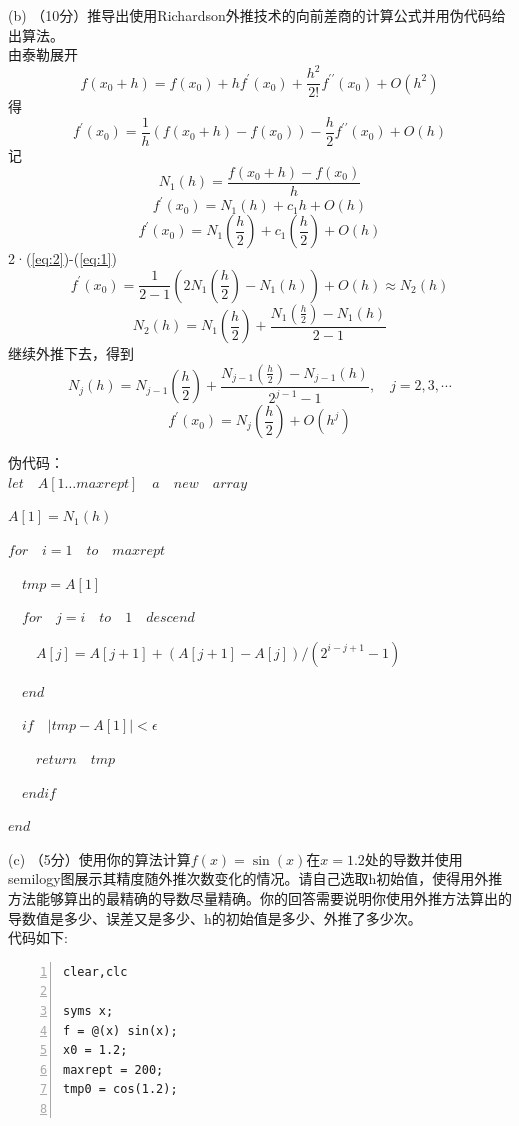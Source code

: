 \documentclass[12pt,a4paper,UTF8]{ctexart}
\begin{document}
\begin{enumerate}
	(b) （10分）推导出使用Richardson外推技术的向前差商的计算公式并用伪代码给出算法。\\

	由泰勒展开
$$f(x_0+h)=f(x_0)+h f^\prime (x_0) + \frac{h^2}{2!}f^{\prime \prime}(x_0)+O(h^2)$$ 
	得
$$f^\prime (x_0) = \frac 1 h (f(x_0 + h)-f(x_0))- \frac{h}{2}f^{\prime \prime}(x_0)+O(h)$$
	记
$$N_1 (h) = \frac{f(x_0 + h)-f(x_0)}{h}$$
\begin{equation}
f^\prime (x_0)=N_1(h)+c_1 h + O(h)
\label{eq:1}
\end{equation}
\begin{equation}
f^\prime (x_0)=N_1(\frac h 2)+c_1 (\frac h 2) + O(h)
\label{eq:2}
\end{equation}
	2·(\ref{eq:2})-(\ref{eq:1})
$$f^\prime(x_0)=\frac 1 {2-1} (2 N_1(\frac h 2)-N_1(h))+O(h)\approx N_2(h)$$
$$N_2(h)= N_1(\frac h 2) + \frac { N_1(\frac h 2)-N_1(h)}{2-1}$$
	继续外推下去，得到
$$N_{j}(h)=N_{j-1}(\frac{h}{2})+\frac{N_{j-1}(\frac{h}{2})-N_{j-1}(h)}{2^{j-1}-1}, \quad j=2,3, \cdots$$
$$f^\prime(x_0)=N_j(\frac h 2)+O(h^j)$$

	伪代码：\\
	
$let \quad A[1\dots maxrept] \quad a\quad  new\quad array$

$A[1] = N_1(h)$

$for \quad i = 1\quad to\quad maxrept$

$\quad tmp = A[1]$

$\quad for \quad j = i\quad to\quad 1\quad descend$

$\quad \quad A[j] = A[j+1]+(A[j+1]-A[j])/(2^{i-j+1}-1)$

$\quad end$

$\quad if \quad \lvert tmp - A[1] \rvert < \epsilon$

$\quad \quad return \quad tmp$

$\quad endif$

$end$

	(c) （5分）使用你的算法计算$f(x) = \sin(x)$在$x = 1.2$处的导数并使用semilogy图展示其精度随外推次数变化的情况。请自己选取h初始值，使得用外推方法能够算出的最精确的导数尽量精确。你的回答需要说明你使用外推方法算出的导数值是多少、误差又是多少、h的初始值是多少、外推了多少次。\\

	代码如下:\\
\begin{lstlisting}[frame=single,numbers=left]
clear,clc

syms x;
f = @(x) sin(x);
x0 = 1.2;
maxrept = 200;
tmp0 = cos(1.2);


\end{lstlisting}
\end{enumerate}
\end{document}
